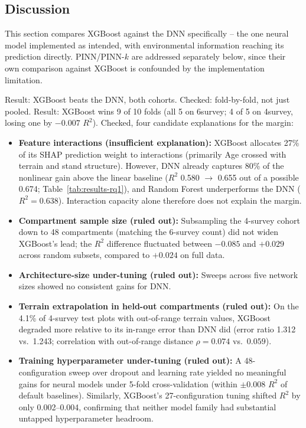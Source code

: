 \documentclass[logo,msc,ai]{infthesis}           %
\begin{document}
\subsection{Discussion}
This section compares XGBoost against the DNN specifically -- the one neural
model implemented as intended, with environmental information reaching its
prediction directly. PINN/PINN-$k$ are addressed separately below, since their
own comparison against XGBoost is confounded by the implementation limitation.

Result: XGBoost beats the DNN, both cohorts.
Checked: fold-by-fold, not just pooled. Result: XGBoost wins 9 of 10 folds (all 5
on 6survey; 4 of 5 on 4survey, losing one by $-0.007$ $R^2$).
Checked, four candidate explanations for the margin:

\begin{itemize}
\item \textbf{Feature interactions (insufficient explanation):} XGBoost allocates 27\% of its SHAP prediction weight to interactions (primarily Age crossed with terrain and stand structure). However, DNN already captures 80\% of the nonlinear gain above the linear baseline ($R^2$ 0.580 $\to$ 0.655 out of a possible 0.674; Table~\ref{tab:results-rq1}), and Random Forest underperforms the DNN ($R^2 = 0.638$). Interaction capacity alone therefore does not explain the margin.
\item \textbf{Compartment sample size (ruled out):} Subsampling the 4-survey cohort down to 48 compartments (matching the 6-survey count) did not widen XGBoost's lead; the $R^2$ difference fluctuated between $-0.085$ and $+0.029$ across random subsets, compared to $+0.024$ on full data.
\item \textbf{Architecture-size under-tuning (ruled out):} Sweeps across five network sizes showed no consistent gains for DNN.
\item \textbf{Terrain extrapolation in held-out compartments (ruled out):} On the 4.1\% of 4-survey test plots with out-of-range terrain values, XGBoost degraded more relative to its in-range error than DNN did (error ratio 1.312 vs.\ 1.243; correlation with out-of-range distance $\rho=0.074$ vs.\ $0.059$).
\item \textbf{Training hyperparameter under-tuning (ruled out):} A 48-configuration sweep over dropout and learning rate yielded no meaningful gains for neural models under 5-fold cross-validation (within $\pm0.008$ $R^2$ of default baselines). Similarly, XGBoost's 27-configuration tuning shifted $R^2$ by only 0.002--0.004, confirming that neither model family had substantial untapped hyperparameter headroom.
\end{itemize}
\end{document}
